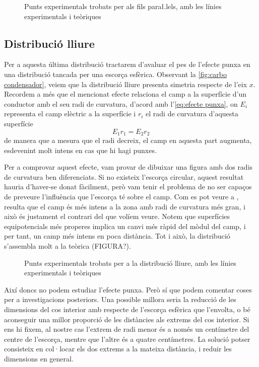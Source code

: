\begin{figure}[htb]
  \centering \small \sffamily
	
  \caption{Punts experimentals trobats per als fils para\l.lels, amb les línies experimentals i teòriques}
  \label{fig:camp fils}
\end{figure}

\subsection{Distribució lliure}
Per a aquesta última distribució tractarem d'avaluar el pes de l'efecte punxa en una distribució tancada per una escorça esfèrica. Observant la \cref{fig:carbo condensador}, veiem que la distribució lliure presenta simetria respecte de l'eix $x$. Recordem a més que el mencionat efecte relaciona el camp a la superfície d'un conductor amb el seu radi de curvatura, d'acord amb l'\cref{eq:efecte punxa}, on $E_i$ representa el camp elèctric a la superfície i $r_i$ el radi de curvatura d'aquesta superfície
\begin{equation} \label{eq:efecte punxa}
	E_1r_1=E_2r_2
\end{equation}
de manera que a mesura que el radi decreix, el camp en aquesta part augmenta, esdevenint molt intens en cas que hi hagi punxes.

Per a comprovar aquest efecte, vam provar de dibuixar una figura amb dos radis de curvatura ben diferenciats. Si no existeix l'escorça circular, aquest resultat hauria d'haver-se donat fàcilment, però vam tenir el problema de no ser capaços de preveure l'influència que l'escorça té sobre el camp. Com es pot veure a , resulta que el camp és més intens a la zona amb radi de curvatura més gran, i això és justament el contrari del que volíem veure. Notem que superfícies equipotencials més properes implica un canvi més ràpid del mòdul del camp, i per tant, un camp més intens en poca distància. Tot i això, la distribució s'assembla molt a la teòrica (FIGURA?).

\begin{figure}[htb]
  \centering \small \sffamily
	
  \caption{ Punts experimentals trobats per a la distribució lliure, amb les línies experimentals i teòriques}
  \label{fig:camp lliure}
\end{figure}

Així doncs no podem estudiar l'efecte punxa. Però sí que podem comentar coses per a investigacions posteriors. Una possible millora seria la reducció de les dimensions del cos interior amb respecte de l'escorça esfèrica que l'envolta, o bé aconseguir una millor proporció de les distàncies als extrems del cos interior. Si ens hi fixem, al nostre cas l'extrem de radi menor és a només un centímetre del centre de l'escorça, mentre que l'altre és a quatre centímetres. La solució potser consisteix en col·locar els dos extrems a la mateixa distància, i reduir les dimensions en general.

